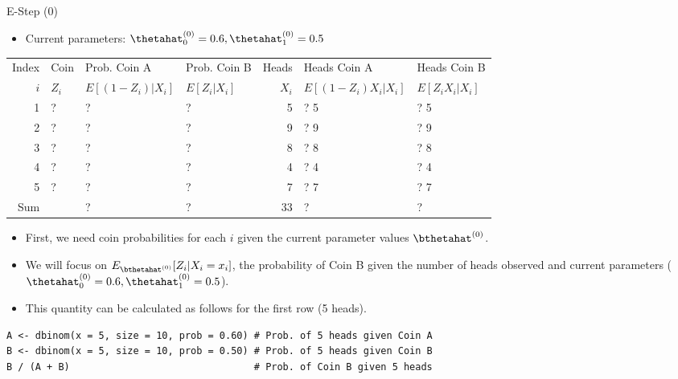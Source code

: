 \documentclass[dvipdfmx,bigger,aspectratio=169]{beamer}
\begin{document}
\begin{frame}[fragile,allowframebreaks,label=,t]{E-Step (0)}
 \begin{itemize}
\item Current parameters: \(\thetahat_{0}^{(0)} = 0.6, \thetahat_{1}^{(0)} = 0.5\)
\end{itemize}
\footnotesize
\begin{center}
\begin{tabular}{r|l|ll|r|ll|}
Index & Coin & Prob. Coin A & Prob. Coin B & Heads & Heads Coin A & Heads Coin B\\
\(i\) & \(Z_{i}\) & \(E[(1-Z_{i})\vert X_{i}]\) & \(E[Z_{i}\vert X_{i}]\) & \(X_{i}\) & \(E[(1-Z_{i}) X_{i} \vert X_{i}]\) & \(E[Z_{i} X_{i} \vert X_{i}]\)\\
\hline
1 & ? & ? & ? & 5 & ? \texttimes{} 5 & ? \texttimes{} 5\\
2 & ? & ? & ? & 9 & ? \texttimes{} 9 & ? \texttimes{} 9\\
3 & ? & ? & ? & 8 & ? \texttimes{} 8 & ? \texttimes{} 8\\
4 & ? & ? & ? & 4 & ? \texttimes{} 4 & ? \texttimes{} 4\\
5 & ? & ? & ? & 7 & ? \texttimes{} 7 & ? \texttimes{} 7\\
\hline
Sum &  & ? & ? & 33 & ? & ?\\
\end{tabular}
\end{center}
\normalsize
\begin{itemize}
\item First, we need coin probabilities for each \(i\) given the current parameter values \(\bthetahat^{(0)}\).
\end{itemize}

\newpage
\begin{itemize}
\item We will focus on \(E_{\bthetahat^{(0)}}[Z_{i} | X_{i} = x_{i}]\), the probability of Coin B given the number of heads observed and current parameters (\(\thetahat_{0}^{(0)} = 0.6, \thetahat_{1}^{(0)} = 0.5\)).
\item This quantity can be calculated as follows for the first row (5 heads).
\end{itemize}

\scriptsize
\begin{verbatim}
A <- dbinom(x = 5, size = 10, prob = 0.60) # Prob. of 5 heads given Coin A
B <- dbinom(x = 5, size = 10, prob = 0.50) # Prob. of 5 heads given Coin B
B / (A + B)                                # Prob. of Coin B given 5 heads
\end{verbatim}


\end{frame}
\end{document}
